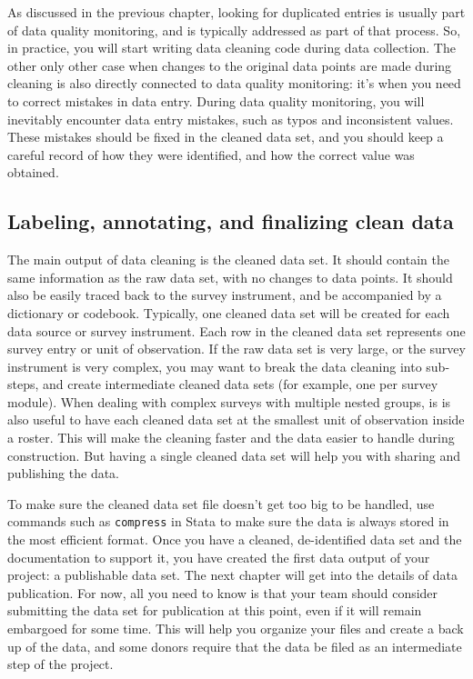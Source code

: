 As discussed in the previous chapter,
looking for duplicated entries is usually part of data quality monitoring,
and is typically addressed as part of that process.
So, in practice, you will start writing data cleaning code during data collection.
The other only other case when changes to the original data points are made during cleaning
is also directly connected to data quality monitoring:
it's when you need to correct mistakes in data entry.
During data quality monitoring, you will inevitably encounter data entry mistakes,
such as typos and inconsistent values.
These mistakes should be fixed in the cleaned data set,
and you should keep a careful record of how they were identified,
and how the correct value was obtained.

\subsection{Labeling, annotating, and finalizing clean data}

The main output of data cleaning is the cleaned data set.
It should contain the same information as the raw data set,
with no changes to data points.
It should also be easily traced back to the survey instrument,
and be accompanied by a dictionary or codebook.
Typically, one cleaned data set will be created for each data source
or survey instrument.
Each row in the cleaned data set represents one survey entry or unit of 
observation.\cite{tidy-data}
If the raw data set is very large, or the survey instrument is very complex,
you may want to break the data cleaning into sub-steps,
and create intermediate cleaned data sets
(for example, one per survey module).
When dealing with complex surveys with multiple nested groups,
is is also useful to have each cleaned data set at the smallest unit of observation inside a roster.
This will make the cleaning faster and the data easier to handle during construction.
But having a single cleaned data set will help you with sharing and publishing the data.

To make sure the cleaned data set file doesn't get too big to be handled,
use commands such as \texttt{compress} in Stata to make sure the data
is always stored in the most efficient format.
Once you have a cleaned, de-identified data set and the documentation to support it,
you have created the first data output of your project:
a publishable data set.
The next chapter will get into the details of data publication.
For now, all you need to know is that your team should consider submitting the data set for publication at this point,
even if it will remain embargoed for some time.
This will help you organize your files and create a back up of the data,
and some donors require that the data be filed as an intermediate step of the project.

